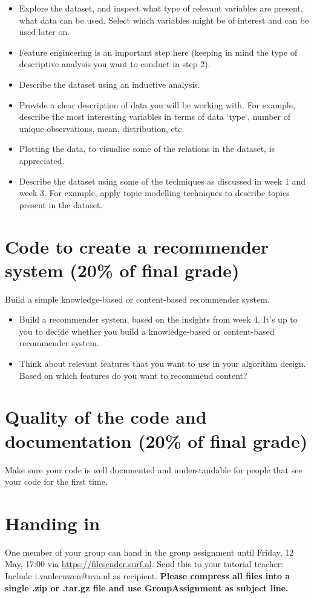 \begin{itemize}
	\item Explore the dataset, and inspect what type of relevant variables are present, what data can be used. Select which variables might be of interest and can be used later on.
	\item Feature engineering is an important step here (keeping in mind the type of descriptive analysis you want to conduct in step 2). 
	\item Describe the dataset using an inductive analysis.
	\item Provide a clear description of data you will be working with. For example, describe the most interesting variables in terms of data `type`, number of unique observations, mean, distribution, etc.
	\item Plotting the data, to visualise some of the relations in the dataset, is appreciated.
	\item Describe the dataset using some of the techniques as discussed in week 1 and week 3. For example, apply topic modelling techniques to describe topics present in the dataset.
\end{itemize}

\section{Code to create a recommender system (20\% of final grade)}

Build a simple knowledge-based or content-based recommender system. 

\begin{itemize}
	\item Build a recommender system, based on the insights from week 4. It's up to you to decide whether you build a knowledge-based or content-based recommender system.
	\item Think about relevant features that you want to use in your algorithm design. Based on which features do you want to recommend content?
\end{itemize}

\section{Quality of the code and documentation (20\% of final grade)}

Make sure your code is well documented and understandable for people that see your code for the first time. 

\section{Handing in}
One member of your group can hand in the group assignment until Friday, 12 May, 17:00 via \url{https://filesender.surf.nl}. Send this to your tutorial teacher: Include i.vanleeuwen@uva.nl as recipient. \textbf{Please compress all files into a single .zip or .tar.gz file and use GroupAssignment as subject line.} 

